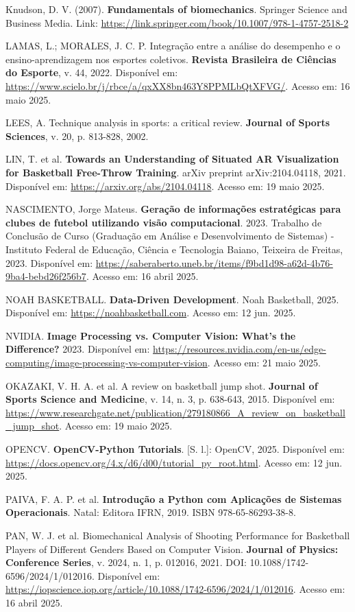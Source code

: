 \begin{flushleft}
Knudson, D. V. (2007). \textbf{Fundamentals of biomechanics}. Springer Science and Business Media. Link: \url{https://link.springer.com/book/10.1007/978-1-4757-2518-2}

LAMAS, L.; MORALES, J. C. P. Integração entre a análise do desempenho e o ensino-aprendizagem nos esportes coletivos. \textbf{Revista Brasileira de Ciências do Esporte}, v. 44, 2022. Disponível em: \url{https://www.scielo.br/j/rbce/a/qxXX8bn463Y8PPMLbQtXFVG/}. Acesso em: 16 maio 2025.

LEES, A. Technique analysis in sports: a critical review. \textbf{Journal of Sports Sciences}, v. 20, p. 813-828, 2002.

LIN, T. et al. \textbf{Towards an Understanding of Situated AR Visualization for Basketball Free-Throw Training}. arXiv preprint arXiv:2104.04118, 2021. Disponível em: \url{https://arxiv.org/abs/2104.04118}. Acesso em: 19 maio 2025.

NASCIMENTO, Jorge Mateus. \textbf{Geração de informações estratégicas para clubes de futebol utilizando visão computacional}. 2023. Trabalho de Conclusão de Curso (Graduação em Análise e Desenvolvimento de Sistemas) - Instituto Federal de Educação, Ciência e Tecnologia Baiano, Teixeira de Freitas, 2023. Disponível em: \url{https://saberaberto.uneb.br/items/f9bd1d98-a62d-4b76-9ba4-bebd26f256b7}. Acesso em: 16 abril 2025.

NOAH BASKETBALL. \textbf{Data-Driven Development}. Noah Basketball, 2025. Disponível em: \url{https://noahbasketball.com}. Acesso em: 12 jun. 2025.

NVIDIA. \textbf{Image Processing vs. Computer Vision: What's the Difference?} 2023. Disponível em: \url{https://resources.nvidia.com/en-us/edge-computing/image-processing-vs-computer-vision}. Acesso em: 21 maio 2025.

OKAZAKI, V. H. A. et al. A review on basketball jump shot. \textbf{Journal of Sports Science and Medicine}, v. 14, n. 3, p. 638-643, 2015. Disponível em: \url{https://www.researchgate.net/publication/279180866_A_review_on_basketball_jump_shot}. Acesso em: 19 maio 2025.

OPENCV. \textbf{OpenCV-Python Tutorials}. [S. l.]: OpenCV, 2025. Disponível em: \url{https://docs.opencv.org/4.x/d6/d00/tutorial_py_root.html}. Acesso em: 12 jun. 2025.

PAIVA, F. A. P. et al. \textbf{Introdução a Python com Aplicações de Sistemas Operacionais}. Natal: Editora IFRN, 2019. ISBN 978-65-86293-38-8.

PAN, W. J. et al. Biomechanical Analysis of Shooting Performance for Basketball Players of Different Genders Based on Computer Vision. \textbf{Journal of Physics: Conference Series}, v. 2024, n. 1, p. 012016, 2021. DOI: 10.1088/1742-6596/2024/1/012016. Disponível em: \url{https://iopscience.iop.org/article/10.1088/1742-6596/2024/1/012016}. Acesso em: 16 abril 2025.


\end{flushleft}
